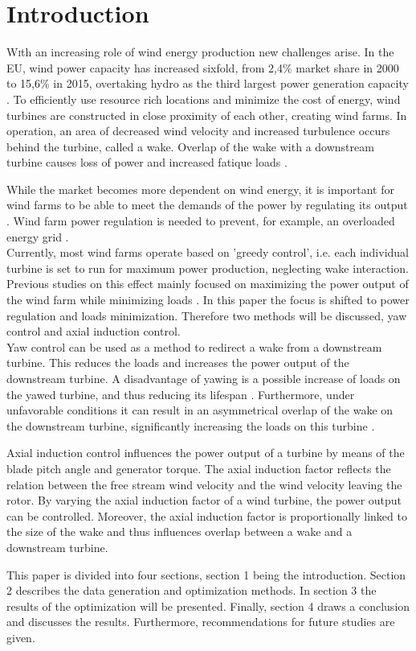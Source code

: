 \section{Introduction}
\lettrine[nindent=0em,lines=3]
With an increasing role of wind energy production new challenges arise\cite{Nat2016}. In the EU, wind power capacity has increased sixfold, from 2,4\% market share in 2000 to 15,6\% in 2015, overtaking hydro as the third largest power generation capacity \cite{EWEA2016}. To efficiently use resource rich locations and minimize the cost of energy, wind turbines are constructed in close proximity of each other, creating wind farms. In operation, an area of decreased wind velocity and increased turbulence occurs behind the turbine, called a wake. Overlap of the wake with a downstream turbine causes loss of power and increased fatique loads \cite{Boersma2017, Wilson2017, Dijk2016, Fleming2014, Zalkind2016}. 

While the market becomes more dependent on wind energy, it is important for wind farms to be able to meet the demands of the power by regulating its output \cite{Tande2003}. Wind farm power regulation is needed to prevent, for example, an overloaded energy grid \cite{Hansen2014}.  \\
\indent Currently, most wind farms operate based on 'greedy control', i.e. each individual turbine is set to run for maximum power production, neglecting wake interaction. Previous studies on this effect mainly focused on maximizing the power output of the wind farm while minimizing loads \cite{Dijk2016, vanDijk2016, Wilson2017}. In this paper the focus is shifted to power regulation and loads minimization. Therefore two methods will be discussed, yaw control and axial induction control. \\
\indent Yaw control can be used as a method to redirect a wake from a downstream turbine. This reduces the loads and increases the power output of the downstream turbine. A disadvantage of yawing is a possible increase of loads on the yawed turbine, and thus reducing its lifespan \cite{Zalkind2016,Kanev2017}. Furthermore, under unfavorable conditions it can result in an asymmetrical overlap of the wake on the downstream turbine, significantly increasing the loads on this turbine \cite{Wilson2017,Dijk2016}. 

Axial induction control influences the power output of a turbine by means of the blade pitch angle and generator torque. The axial induction factor reflects the relation between the free stream wind velocity and the wind velocity leaving the rotor. By varying the axial induction factor of a wind turbine, the power output can be controlled. Moreover, the axial induction factor is proportionally linked to the size of the wake and thus influences overlap between a wake and a downstream turbine.  

This paper is divided into four sections, section 1 being the introduction. Section 2 describes the data generation and optimization methods. In section 3 the results of the optimization will be presented. Finally, section 4 draws a conclusion and discusses the results. Furthermore, recommendations for future studies are given.

